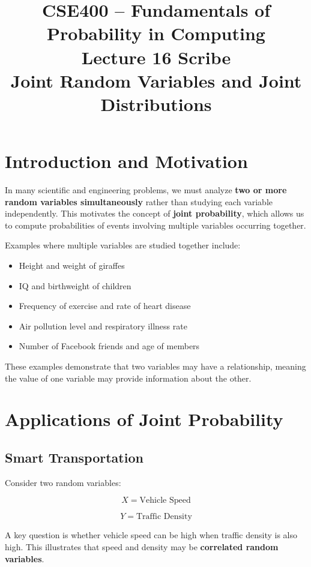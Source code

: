 \documentclass[12pt]{article}
\title{CSE400 -- Fundamentals of Probability in Computing\\
Lecture 16 Scribe\\
Joint Random Variables and Joint Distributions}
\author{}
\date{}
\begin{document}
\maketitle

\section{Introduction and Motivation}

In many scientific and engineering problems, we must analyze \textbf{two or more random variables simultaneously} rather than studying each variable independently. This motivates the concept of \textbf{joint probability}, which allows us to compute probabilities of events involving multiple variables occurring together.

Examples where multiple variables are studied together include:

\begin{itemize}
\item Height and weight of giraffes
\item IQ and birthweight of children
\item Frequency of exercise and rate of heart disease
\item Air pollution level and respiratory illness rate
\item Number of Facebook friends and age of members
\end{itemize}

These examples demonstrate that two variables may have a relationship, meaning the value of one variable may provide information about the other.

\section{Applications of Joint Probability}

\subsection{Smart Transportation}

Consider two random variables:

\[
X = \text{Vehicle Speed}
\]

\[
Y = \text{Traffic Density}
\]

A key question is whether vehicle speed can be high when traffic density is also high. This illustrates that speed and density may be \textbf{correlated random variables}.
\end{document}
